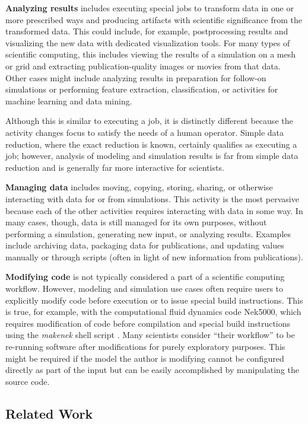 \textbf{Analyzing results} includes executing special jobs to transform
data in one or more prescribed ways and producing artifacts with
scientific significance from the transformed data. This could include, for
example, postprocessing results and visualizing the new data with
dedicated visualization tools. For many types of scientific computing,
this includes viewing the results of a simulation on a mesh or grid and
extracting publication-quality images or movies from that data. Other
cases might include analyzing results in preparation for follow-on
simulations or performing feature extraction, classification, or
activities for machine learning and data mining.

Although this is similar to executing a job, it is distinctly
different because the activity changes focus to satisfy the needs of a
human operator. Simple data reduction, where the exact reduction is
known, certainly qualifies as executing a job; however, analysis of
modeling and simulation results is far from simple data reduction and is
generally far more interactive for scientists.

\textbf{Managing data} includes moving, copying, storing, sharing, or
otherwise interacting with data for or from simulations. This activity
is the most pervasive because each of the other activities requires
interacting with data in some way. In many cases, though, data is still
managed for its own purposes, without performing a simulation,
generating new input, or analyzing results. Examples include archiving
data, packaging data for publications, and updating values manually or through
scripts (often in light of new information from publications).

\textbf{Modifying code} is not typically considered a part of a
scientific computing workflow. However, modeling and simulation use
cases often require users to explicitly modify code before execution or to
issue special build instructions. This is true, for example, with the
computational fluid dynamics code Nek5000, which requires modification of code
before compilation and special build instructions using the \textit{makenek}
shell script \cite{the_nek5000_team_nek5000_2014}.
Many scientists consider ``their workflow'' to be re-running
software after modifications for purely exploratory purposes. This might
be required if the model the author is modifying cannot be
configured directly as part of the input but can be easily accomplished by
manipulating the source code.

\subsection{Related Work}\label{comparison-to-other-models}

